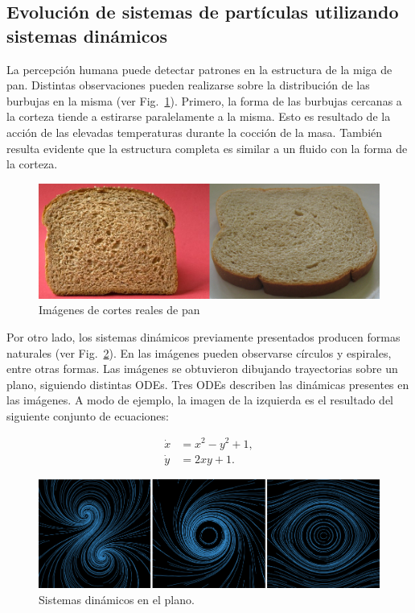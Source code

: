 \documentclass[oneside,a4paper,spanish,links]{amca}
\begin{document}
\subsection{Evoluci\'on de sistemas de part\'iculas utilizando sistemas din\'amicos}

La percepci\'on humana puede detectar patrones en la estructura de la miga de pan. Distintas observaciones pueden realizarse sobre la distribuci\'on de las burbujas en la misma (ver Fig.~\ref{fg:fig2}). Primero, la forma de las burbujas cercanas a la corteza tiende a estirarse paralelamente a la misma. Esto es resultado de la acci\'on de las elevadas temperaturas durante la cocci\'on de la masa. Tambi\'en resulta evidente que la estructura completa es similar a un fluido con la forma de la corteza.


\begin{figure}[htb!]
  \centerline{\includegraphics[scale=0.45]{fig2}}
  \caption{Im\'agenes de cortes reales de pan}
  \label{fg:fig2}
\end{figure}

Por otro lado, los sistemas din\'amicos previamente presentados producen formas naturales (ver Fig.~\ref{fg:fig3}). En las im\'agenes pueden observarse c\'irculos y espirales, entre otras formas. Las im\'agenes se obtuvieron dibujando trayectorias sobre un plano, siguiendo distintas ODEs. Tres ODEs describen las din\'amicas presentes en las im\'agenes. A modo de ejemplo, la imagen de la izquierda es el resultado del siguiente conjunto de ecuaciones:

\begin{equation} \label{eq:simple}  
  \begin{aligned}
    \dot{x} &= x^{2}-y^{2}+1,\\
    \dot{y} &= 2xy+1.
  \end{aligned}
\end{equation}


\begin{figure}[htb!]
  \centerline{\includegraphics[scale=0.28]{fig3}}
  \caption{Sistemas din\'amicos en el plano.}
  \label{fg:fig3}
\end{figure}
\end{document}
